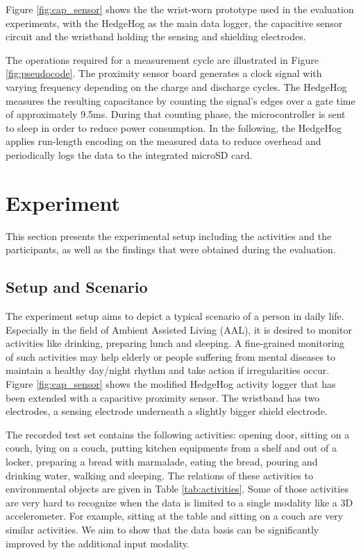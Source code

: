 \documentclass[runningheads,a4paper]{llncs}
\begin{document}
Figure \ref{fig:cap_sensor} shows the the wrist-worn prototype used in the evaluation experiments, with the HedgeHog as the main data logger, the capacitive sensor circuit and the wristband holding the sensing and shielding electrodes.

The operations required for a measurement cycle are illustrated in Figure \ref{fig:pseudocode}. The proximity sensor board generates a clock signal with varying frequency depending on the charge and discharge cycles. The HedgeHog measures the resulting capacitance by counting the signal's edges over a gate time of approximately 9.5ms. During that counting phase, the microcontroller is sent to sleep in order to reduce power consumption. In the following, the HedgeHog applies run-length encoding on the measured data to reduce overhead and periodically logs the data to the integrated microSD card.

\section{Experiment}
\label{sect:experiment}

This section presents the experimental setup including the activities and the participants, as well as the findings that were obtained during the evaluation.

\subsection{Setup and Scenario}

The experiment setup aims to depict a typical scenario of a person in daily life. Especially in the field of Ambient Assisted Living (AAL), it is desired to monitor activities like drinking, preparing lunch and sleeping. A fine-grained monitoring of such activities may help elderly or people suffering from mental diseases to maintain a healthy day/night rhythm and take action if irregularities occur. Figure \ref{fig:cap_sensor} shows the modified HedgeHog activity logger that has been extended with a capacitive proximity sensor. The wristband has two electrodes, a sensing electrode underneath a slightly bigger shield electrode. 

The recorded test set contains the following activities: opening door, sitting on a couch, lying on a couch, putting kitchen equipments from a shelf and out of a locker, preparing a bread with marmalade, eating the bread, pouring and drinking water, walking and sleeping. The relations of these activities to environmental objects are given in Table \ref{tab:activities}. Some of those activities are very hard to recognize when the data is limited to a single modality like a 3D accelerometer. For example, sitting at the table and sitting on a couch are very similar activities. We aim to show that the data basis can be significantly improved by the additional input modality. 
\end{document}
